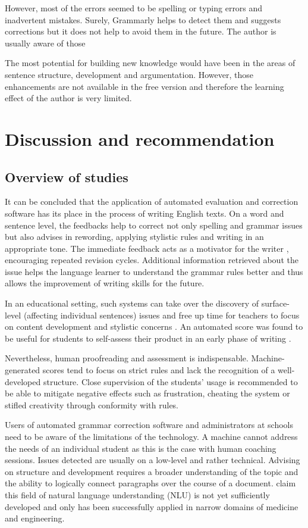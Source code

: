 \documentclass[runningheads]{llncs}
\let\OldTextregistered\textregistered
\renewcommand{\textregistered}{\OldTextregistered\xspace}
\begin{document}
However, most of the errors seemed to be spelling or typing errors and inadvertent mistakes. Surely, Grammarly\textregistered helps to detect them and suggests corrections but it does not help to avoid them in the future. The author is usually aware of those 

The most potential for building new knowledge would have been in the areas of sentence structure, development and argumentation. However, those enhancements are not available in the free version and therefore the learning effect of the author is very limited.

\section{Discussion and recommendation}
\subsection{Overview of studies}
It can be concluded that the application of automated evaluation and correction software has its place in the process of writing English texts. On a word and sentence level, the feedbacks help to correct not only spelling and grammar issues but also advises in rewording, applying stylistic rules and writing in an appropriate tone. The immediate feedback acts as a motivator for the writer \citep{grimes_utility_2010}, encouraging repeated revision cycles. Additional information retrieved about the issue helps the language learner to understand the grammar rules better and thus allows the improvement of writing skills for the future. 

In an educational setting, such systems can take 
over the discovery of surface-level (affecting individual sentences) issues and free up time for teachers to focus on content development and stylistic concerns \citep{dembsey_closing_2017}. An automated score was found to be useful for students to self-assess their product in an early phase of writing \citep{grimes_utility_2010}. 

Nevertheless, human proofreading and assessment is indispensable. Machine-generated scores tend to focus on strict rules and lack the recognition of a well-developed structure. Close supervision of the students' usage is recommended to be able to mitigate negative effects such as frustration, cheating the system or stifled creativity through conformity with rules.

Users of automated grammar correction software and administrators at schools need to be aware of the limitations of the technology. A machine cannot address the needs of an individual student as this is the case with human coaching sessions. Issues detected are usually on a low-level and rather technical. Advising on structure and development requires a broader understanding of the topic and the ability to logically connect paragraphs over the course of a document. \textcite{grimes_utility_2010} claim this field of natural language understanding (NLU) is not yet sufficiently developed and only has been successfully applied in narrow domains of medicine and engineering.
\end{document}

